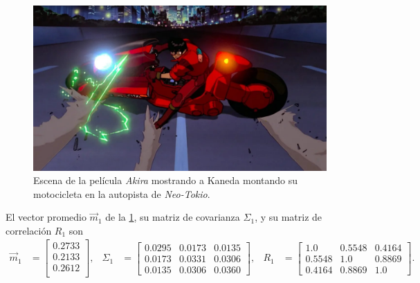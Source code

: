 \begin{figure}[ht!]
    \centering
    \includegraphics[scale=0.2]{../figures/akira.jpg}
    \caption{Escena de la película \textit{Akira} mostrando a Kaneda montando su motocicleta en la autopista de \textit{Neo-Tokio}.}
    \label{fig:akira-bike}
\end{figure}

El vector promedio $\vec{m}_1$ de la \cref{fig:akira-bike}, su matriz de covarianza $\Sigma_1$, y su matriz de correlación $R_1$ son
\begin{align*}
    \vec{m}_1 & =
    \begin{bmatrix}
        0.2733 \\
        0.2133 \\
        0.2612 \\
    \end{bmatrix}, &
    \Sigma_1 & =
    \begin{bmatrix}
        0.0295 & 0.0173 & 0.0135 \\
        0.0173 & 0.0331 & 0.0306 \\
        0.0135 & 0.0306 & 0.0360 
    \end{bmatrix}, &
    R_1 & = 
    \begin{bmatrix}
        1.0    & 0.5548 & 0.4164 \\
        0.5548 & 1.0    & 0.8869 \\
        0.4164 & 0.8869 & 1.0
    \end{bmatrix}.
\end{align*}

